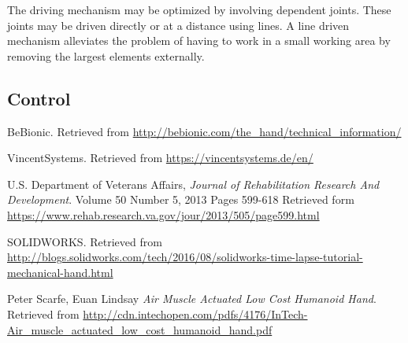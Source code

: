 \documentclass{article}
\begin{document}
The driving mechanism may be optimized by involving dependent joints. These joints may be driven directly or at a distance using lines. A line driven mechanism alleviates the problem of having to work in a small working area by removing the largest elements externally. 

\subsection{Control}

\break
\begin{thebibliography}{1}
   BeBionic. Retrieved from {\url{http://bebionic.com/the_hand/technical_information/}} 

   VincentSystems. Retrieved from {\url{  https://vincentsystems.de/en/}} 

   U.S. Department of Veterans Affairs, {\em Journal of Rehabilitation Research And Development}. Volume 50 Number 5, 2013
   Pages 599-618 Retrieved form {\url{https://www.rehab.research.va.gov/jour/2013/505/page599.html}}
   
      SOLIDWORKS. Retrieved from {\url{ http://blogs.solidworks.com/tech/2016/08/solidworks-time-lapse-tutorial-mechanical-hand.html}} 

      Peter Scarfe, Euan Lindsay {\em Air Muscle Actuated Low Cost Humanoid Hand}. Retrieved from {\url{ http://cdn.intechopen.com/pdfs/4176/InTech-Air_muscle_actuated_low_cost_humanoid_hand.pdf
}} 
\end{thebibliography}
  
\end{document}
